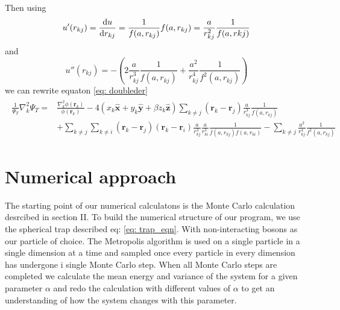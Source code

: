 \documentclass[a4paper, 10pt, english]{revtex4-2} %
\begin{document}
        Then using 
        \begin{equation}
                u'(r_{kj})
            =   \derivative{u}{r_{kj}}
            =   \frac{1}{f(a, r_{kj})} f(a,r_{kj})
            =   \frac{a}{r_{kj}^2}\frac{1}{f(a, r{kj})}
        \end{equation}
        and
        \begin{equation}
                u''(r_{kj})
            =   - \left(2\frac{a}{r_{kj}^3}\frac{1}{f(a, r_{kj})} + \frac{a^2}{r_{kj}^4}\frac{1}{f^2(a, r_{kj})}\right)
        \end{equation}
        we can rewrite equaton \ref{eq: doubleder}
        \begin{align}
        \begin{split}
                \frac{1}{\Psi_T} \nabla_k^2 \Psi_T
            =   &\frac{\nabla_k^2 \phi(\mathbf{r}_k)}{\phi(\mathbf{r}_k)}
                - 4 \left(x_k\mathbf{\hat{x}} + y_k\mathbf{\hat{y}} + \beta z_k\mathbf{\hat{z}}\right) \sum_{k \neq j}(\mathbf{r}_k - \mathbf{r}_j)\frac{a}{r_{kj}^3}\frac{1}{f(a, r_{kj})} \\
                &+ \sum_{k\neq j}\sum_{k\neq i} (\mathbf{r}_k - \mathbf{r}_j)(\mathbf{r}_k - \mathbf{r}_i) \frac{a}{r_{kj}^3} \frac{a}{r_{ki}^3} \frac{1}{f(a, r_{kj})f(a, r_{ki})}
                - \sum_{k \neq j}\frac{a^2}{r_{kj}^4}\frac{1}{f^2(a, r_{kj})}
        \end{split}
        \end{align}


\section{\large Numerical approach}
    The starting point of our numerical calculatons is the Monte Carlo calculation desrcibed in section II.
    To build the numerical structure of our program, we use the spherical trap described eq: \ref{eq: trap_eqn}.
    With non-interacting bosons as our particle of choice.
    The Metropolis algorithm is used on a single particle in a single dimension at a time and sampled once every particle in every dimension has undergone i single Monte Carlo step.
    When all Monte Carlo steps are completed we calculate the mean energy and variance of the system for a given parameter $\alpha$ and redo the calculation with different values of $\alpha$ to get an understanding of how the system changes with this parameter.
    
\end{document}
